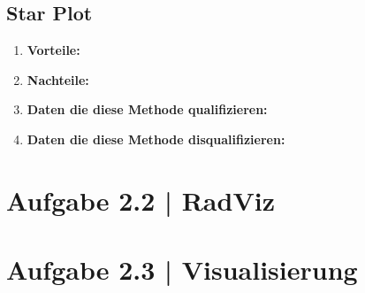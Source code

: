 \documentclass[a4paper,12pt,ngerman]{scrartcl}
\begin{document}
\subsection*{Star Plot}
\blindtext
\begin{enumerate}
	\item \textbf{Vorteile:}
	\item \textbf{Nachteile:}
	\item \textbf{Daten die diese Methode qualifizieren:}
	\item \textbf{Daten die diese Methode disqualifizieren:}
\end{enumerate}

\section{Aufgabe 2.2 | RadViz}
\blindtext

\section{Aufgabe 2.3 | Visualisierung}
\blindtext
\end{document}
